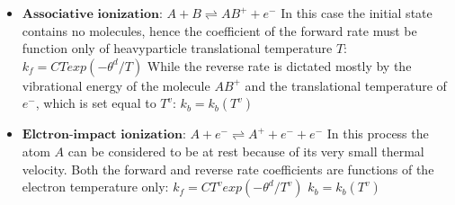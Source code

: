 \documentclass[letterpaper,10pt,english]{jupyterBook}
\begin{document}
\begin{itemize}
\item {} 
\sphinxAtStartPar
\(\textbf{Associative ionization}\):
\(
A + B \rightleftharpoons AB^+ + e^-
\) 
In this case the initial state contains no molecules, hence the coefficient of the forward rate must be  function only of heavy\sphinxhyphen{}particle translational temperature \(T\):
\(k_f = C T exp(- \theta^d/T)\) 
While the reverse rate is dictated mostly by the vibrational energy of the molecule \(AB^+\) and the translational temperature of \(e^-\), which is set equal to \(T^v\):
\(k_b = k_b(T^v)\)

\item {} 
\sphinxAtStartPar
\(\textbf{Elctron-impact ionization}\):
\(
A + e^- \rightleftharpoons A^+ + e^- + e^-
\) 
In this process the atom \(A\) can be considered to be at rest because of its very small thermal velocity. Both the forward and reverse rate coefficients are functions of the electron temperature only:
\(k_f = C T^v exp(- \theta^d/T^v)\) 
\(k_b = k_b(T^v)\)

\end{itemize}
\end{document}
